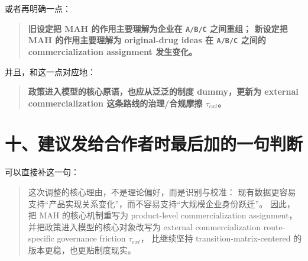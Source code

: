 \documentclass[12pt,fontset=none]{ctexart}
\begin{document}
或者再明确一点：

\begin{quote}
\textbf{旧设定把 MAH 的作用主要理解为企业在 \texttt{A/B/C} 之间重组；
新设定把 MAH 的作用主要理解为 original-drug ideas 在 \texttt{A/B/C}
之间的 commercialization assignment 发生变化。}
\end{quote}

并且，和这一点对应地：

\begin{quote}
\textbf{政策进入模型的核心原语，也应从泛泛的制度 dummy，更新为
external commercialization 这条路线的治理/合规摩擦
\(\tau_{ext}\)。}
\end{quote}

\section{十、建议发给合作者时最后加的一句判断}

可以直接补这一句：

\begin{quote}
这次调整的核心理由，不是理论偏好，而是识别与校准：
现有数据更容易支持“产品实现关系变化”，而不容易支持“大规模企业身份跃迁”。
因此，把 MAH 的核心机制重写为
product-level commercialization assignment，
并把政策进入模型的核心对象改写为
external commercialization route-specific governance friction
\(\tau_{ext}\)，
比继续坚持 transition-matrix-centered 的版本更稳，也更贴制度现实。
\end{quote}
\end{document}
